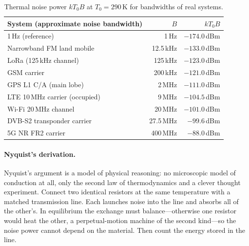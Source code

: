 \begin{table}[htbp]\centering\small
\caption{Thermal noise power $kT_0B$ at $T_0=290$\,K for bandwidths of real systems.}
\label{tab:ch03:ktb}
\begin{tabular}{@{}lrr@{}}
\toprule
System (approximate noise bandwidth) & $B$ & $kT_0B$\\
\midrule
1\,Hz (reference) & 1\,Hz & $-174.0$\,dBm\\
Narrowband FM land mobile & 12.5\,kHz & $-133.0$\,dBm\\
LoRa (125\,kHz channel) & 125\,kHz & $-123.0$\,dBm\\
GSM carrier & 200\,kHz & $-121.0$\,dBm\\
GPS L1 C/A (main lobe) & 2\,MHz & $-111.0$\,dBm\\
LTE 10\,MHz carrier (occupied) & 9\,MHz & $-104.5$\,dBm\\
Wi-Fi 20\,MHz channel & 20\,MHz & $-101.0$\,dBm\\
DVB-S2 transponder carrier & 27.5\,MHz & $-99.6$\,dBm\\
5G NR FR2 carrier & 400\,MHz & $-88.0$\,dBm\\
\bottomrule
\end{tabular}
\end{table}

\paragraph{Nyquist's derivation.} Nyquist's argument is a model of physical reasoning: no
microscopic model of conduction at all, only the second law of thermodynamics and a clever thought
experiment. Connect two identical resistors at the same temperature with a matched transmission line.
Each launches noise into the line and absorbs all of the other's. In equilibrium the exchange must
balance---otherwise one resistor would heat the other, a perpetual-motion machine of the second
kind---so the noise power cannot depend on the material. Then count the energy stored in the line.

